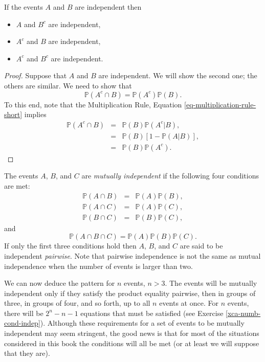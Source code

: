 \begin{prop}
If the events \(A\) and \(B\) are independent then
\begin{itemize}
\item \(A\) and \(B^{c}\) are independent,
\item \(A^{c}\) and \(B\) are independent,
\item \(A^{c}\) and \(B^{c}\) are independent.
\end{itemize}
\end{prop}

\begin{proof}
Suppose that \(A\) and \(B\) are independent. We will show the second
one; the others are similar. We need to show that \[
\mathbb{P}(A^{c}\cap B)=\mathbb{P}(A^{c})\mathbb{P}(B).  \] To this
end, note that the Multiplication Rule, Equation
\eqref{eq-multiplication-rule-short} implies
\begin{eqnarray*}
\mathbb{P}(A^{c}\cap B) & = & \mathbb{P}(B)\mathbb{P}(A^{c}|B),\\
 & = & \mathbb{P}(B)[1-\mathbb{P}(A|B)],\\
 & = & \mathbb{P}(B)\mathbb{P}(A^{c}).
\end{eqnarray*}
\end{proof}

\begin{defn}
The events \(A\), \(B\), and \(C\) are \emph{mutually independent} if the
following four conditions are met:
\begin{eqnarray*}
\mathbb{P}(A\cap B) & = & \mathbb{P}(A)\mathbb{P}(B),\\
\mathbb{P}(A\cap C) & = & \mathbb{P}(A)\mathbb{P}(C),\\
\mathbb{P}(B\cap C) & = & \mathbb{P}(B)\mathbb{P}(C),
\end{eqnarray*}
and
\[
\mathbb{P}(A\cap B\cap C)=\mathbb{P}(A)\mathbb{P}(B)\mathbb{P}(C).
\]
If only the first three conditions hold then \(A\), \(B\), and \(C\)
are said to be independent \emph{pairwise}. Note that pairwise independence
is not the same as mutual independence when the number of events is
larger than two.
\end{defn}

We can now deduce the pattern for \(n\) events, \(n>3\). The events
will be mutually independent only if they satisfy the product equality
pairwise, then in groups of three, in groups of four, and so forth, up
to all \(n\) events at once. For \(n\) events, there will be
\(2^{n}-n-1\) equations that must be satisfied (see Exercise \ref{xca-numb-cond-indep}). Although these requirements for a set of events to
be mutually independent may seem stringent, the good news is that for
most of the situations considered in this book the conditions will all
be met (or at least we will suppose that they are).

